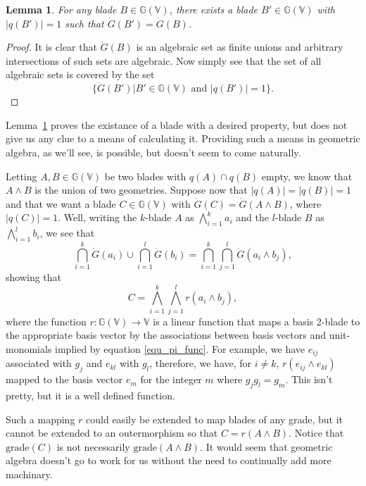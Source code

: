 \documentclass{birkjour}
\newtheorem{lem}[thm]{Lemma}
\theoremstyle{definition}
\theoremstyle{remark}
\numberwithin{equation}{section}
\newcommand{\G}{\mathbb{G}}
\newcommand{\V}{\mathbb{V}}
\newcommand{\Gi}{\dot{G}}
\begin{document}
\begin{lem}\label{lma_geo_reduction}
For any blade $B\in\G(\V)$, there exists a blade $B'\in\G(\V)$ with $|q(B')|=1$ such
that $\Gi(B')=\Gi(B)$.
\end{lem}
\begin{proof}
It is clear that $\Gi(B)$ is an algebraic set as finite unions and arbitrary
intersections of such sets are algebraic.  Now simply see that the set of all
algebraic sets is covered by the set
\begin{equation}
\{\Gi(B')|\mbox{$B'\in\G(\V)$ and $|q(B')|=1$}\}.
\end{equation}
\end{proof}
Lemma~\ref{lma_geo_reduction} proves the existance of a blade with a desired
property, but does not give us
any clue to a means of calculating it.  Providing such a means in geometric algebra,
as we'll see, is possible, but doesn't seem to come naturally.

Letting $A,B\in\G(\V)$ be two blades with $q(A)\cap q(B)$ empty,
we know that $A\wedge B$ is the union of two geometries.  Suppose
now that $|q(A)|=|q(B)|=1$ and that we want a blade $C\in\G(\V)$
with $\Gi(C)=\Gi(A\wedge B)$, where $|q(C)|=1$.
Well, writing the $k$-blade $A$ as $\bigwedge_{i=1}^k a_i$
and the $l$-blade $B$ as $\bigwedge_{i=1}^l b_i$, we see that
\begin{equation}
\bigcap_{i=1}^k\Gi(a_i)\cup\bigcap_{i=1}^l\Gi(b_i) = \bigcap_{i=1}^k\bigcap_{j=1}^l \Gi(a_i\wedge b_j),
\end{equation}
showing that
\begin{equation}
C=\bigwedge_{i=1}^k\bigwedge_{j=1}^l r(a_i\wedge b_j),
\end{equation}
where the function $r:\G(\V)\to\V$ is a linear function that maps
a basis 2-blade to the appropriate basis vector by the associations between
basis vectors and unit-monomials implied by equation \eqref{equ_pi_func}.
For example, we have $e_{ij}$ associated with $g_j$ and $e_{kl}$ with $g_l$,
therefore, we have, for $i\neq k$, $r(e_{ij}\wedge e_{kl})$ mapped to the basis vector $e_m$ for
the integer $m$ where $g_jg_l=g_m$.  This isn't pretty, but it is a well defined
function.

Such a mapping $r$ could easily be extended to map blades of any grade,
but it cannot be extended to an outermorphism so that $C=r(A\wedge B)$.
Notice that $\mbox{grade}(C)$ is not necessarily $\mbox{grade}(A\wedge B)$.
It would seem that geometric algebra doesn't go to work for us without the need
to continually add more machinary.
\end{document}
